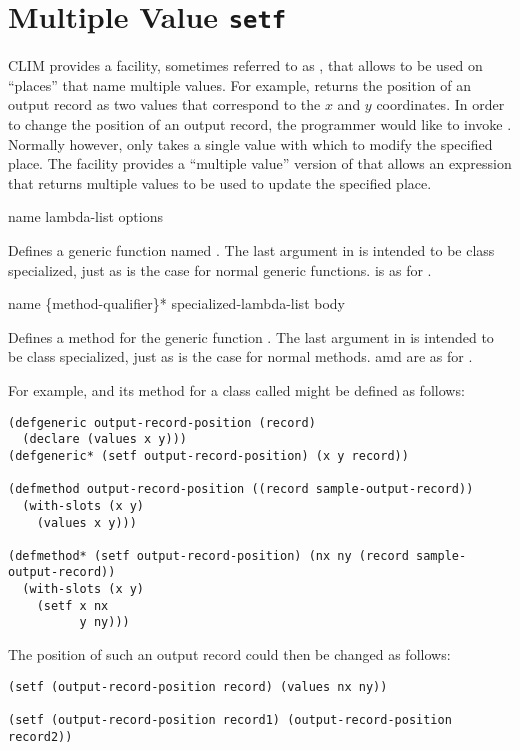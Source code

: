 \section {Multiple Value {\tt setf}}

CLIM provides a facility, sometimes referred to as , that allows
 to be used on ``places'' that name multiple values.  For example,
 returns the position of an output record as two
values that correspond to the $x$ and $y$ coordinates.  In order to change the
position of an output record, the programmer would like to invoke
.  Normally however,  only takes a
single value with which to modify the specified place.  The  facility
provides a ``multiple value'' version of  that allows an expression
that returns multiple values to be used to update the specified place.

 {name lambda-list \body options}

Defines a  generic function named .  The last argument in
 is intended to be class specialized, just as is the case for
normal  generic functions.   is as for .

 {name \{method-qualifier\}* specialized-lambda-list \body body}

Defines a  method for the generic function .  The last
argument in  is intended to be class specialized,
just as is the case for normal  methods.  
amd  are as for .


For example,  and its  method for a class
called  might be defined as follows:

\begin{verbatim}
(defgeneric output-record-position (record)
  (declare (values x y)))
(defgeneric* (setf output-record-position) (x y record))

(defmethod output-record-position ((record sample-output-record))
  (with-slots (x y)
    (values x y)))

(defmethod* (setf output-record-position) (nx ny (record sample-output-record))
  (with-slots (x y)
    (setf x nx
          y ny)))
\end{verbatim}

The position of such an output record could then be changed as follows:

\begin{verbatim}
(setf (output-record-position record) (values nx ny))

(setf (output-record-position record1) (output-record-position record2))
\end{verbatim}

